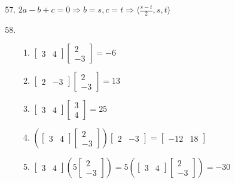 \documentclass[12pt]{article}
\begin{document}
\begin{enumerate}
    \setcounter{enumi}{56}

  \item $2a-b+c=0\Rightarrow b=s, c=t\Rightarrow \langle \frac{s-t}{2},s,t\rangle$

    \setcounter{enumi}{66}

  \item

    \begin{enumerate}

      \item $\begin{bmatrix}3 & 4 \end{bmatrix}\begin{bmatrix}2\\-3 \end{bmatrix}=-6$

      \item $\begin{bmatrix} 2 & -3 \end{bmatrix} \begin{bmatrix} 2\\-3  \end{bmatrix}=13$

      \item $\begin{bmatrix} 3 & 4  \end{bmatrix} \begin{bmatrix} 3\\4  \end{bmatrix}=25$

      \item $\left(\begin{bmatrix}3 & 4 \end{bmatrix}\begin{bmatrix}2\\-3 \end{bmatrix}\right)\begin{bmatrix} 2 & -3\end{bmatrix}=\begin{bmatrix} -12 & 18 \end{bmatrix}$

      \item $\begin{bmatrix}3 & 4 \end{bmatrix}\left(5\begin{bmatrix}2\\-3 \end{bmatrix}\right)=5\left(\begin{bmatrix}3 & 4 \end{bmatrix}\begin{bmatrix}2\\-3 \end{bmatrix}\right)=-30$


\end{enumerate}
\end{enumerate}
\end{document}
